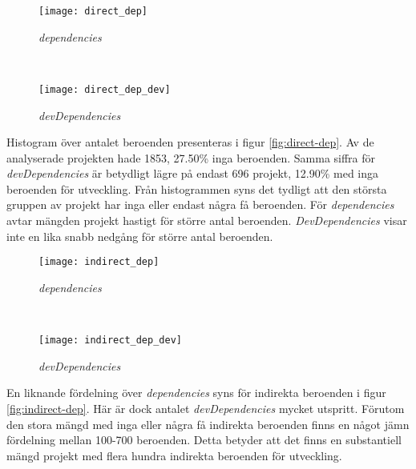\begin{figure*}
    \centering
    \begin{subfigure}[]{0.5\textwidth}
        \centering
        \texttt{[image: direct\_dep]}
        \caption{\textit{dependencies}}
    \end{subfigure}%
    ~
    \begin{subfigure}[]{0.5\textwidth}
        \centering
        \texttt{[image: direct\_dep\_dev]}
        \caption{\textit{devDependencies}}
    \end{subfigure}
    \caption{Histogram över projekt med maximalt 50 direkta beroenden}
    \label{fig:direct-dep}
\end{figure*}

Histogram över antalet beroenden presenteras i figur \ref{fig:direct-dep}. Av de analyserade projekten hade 1853, 27.50\% inga beroenden. Samma siffra för \textit{devDependencies} är betydligt lägre på endast 696 projekt, 12.90\% med inga beroenden för utveckling. Från histogrammen syns det tydligt att den största gruppen av projekt har inga eller endast några få beroenden. För \textit{dependencies} avtar mängden projekt hastigt för större antal beroenden. \textit{DevDependencies} visar inte en lika snabb nedgång för större antal beroenden.

\begin{figure*}
    \centering
    \begin{subfigure}[]{0.5\textwidth}
        \centering
        \texttt{[image: indirect\_dep]}
        \caption{\textit{dependencies}}
    \end{subfigure}%
    ~
    \begin{subfigure}[]{0.5\textwidth}
        \centering
        \texttt{[image: indirect\_dep\_dev]}
        \caption{\textit{devDependencies}}
    \end{subfigure}
    \caption{Histogram över projekt med maximalt 1800 indirekta beroenden}
    \label{fig:indirect-dep}
\end{figure*}

En liknande fördelning över \textit{dependencies} syns för indirekta beroenden i figur \ref{fig:indirect-dep}. Här är dock antalet \textit{devDependencies} mycket utspritt. Förutom den stora mängd med inga eller några få indirekta beroenden finns en något jämn fördelning mellan 100-700 beroenden. Detta betyder att det finns en substantiell mängd projekt med flera hundra indirekta beroenden för utveckling.

